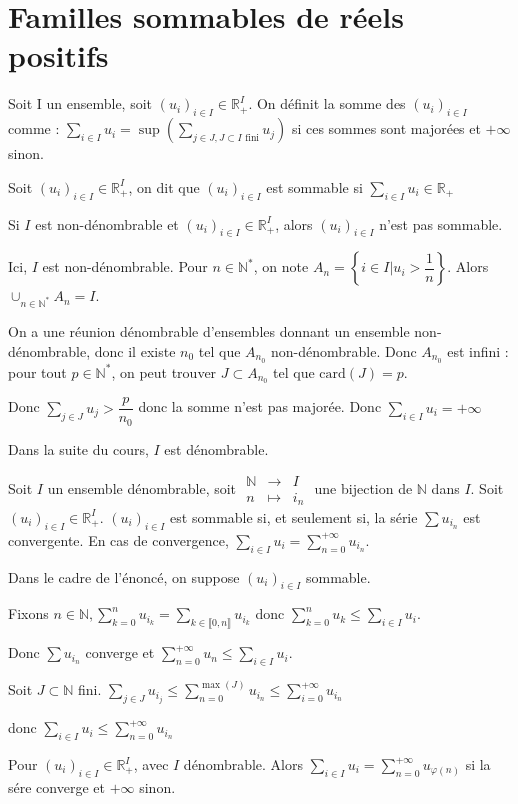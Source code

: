 \documentclass[a4paper,12pt]{book}
\newcommand{\Def}[2]{\begin{tcolorbox}[sharp corners, colback=white,colframe=blue!90!black!75, title=Définition : #1]#2\end{tcolorbox}}
\newcommand{\Thr}[2]{\begin{tcolorbox}[sharp corners, colback=white,colframe=red!90!black!75, title=Théorème : #1]#2\end{tcolorbox}}
\newcommand{\Prop}[2]{\begin{tcolorbox}[sharp corners, colback=white,colframe=red!90!black!75, title=Proposition : #1]#2\end{tcolorbox}}
\newcommand{\Pre}[1]{\begin{tcolorbox}[sharp corners, colback=white,colframe=green!60!green!30!black!75, title=Preuve]#1\end{tcolorbox}}
\def\R{\mathbb{R}}
\def\N{\mathbb{N}}
\begin{document}
\section{Familles sommables de réels positifs}
\Def{Somme de familles réelles positives}{Soit I un ensemble, soit $(u_i)_{i\in I}\in \R_+^I$. On définit la somme des $(u_i)_{i\in I}$ comme : $\sum\limits_{i\in I} u_i = \sup\left(\sum\limits_{j\in J, J\subset I\text{ fini}} u_j\right)$ si ces sommes sont majorées et $+\infty$ sinon.}
\Def{Familles sommables de réels positifs}{Soit $(u_i)_{i\in I}\in\R_+^I$, on dit que $(u_i)_{i\in I}$ est sommable si $\sum\limits_{i\in I} u_i\in \R_+$}
\Prop{Sommabilité et dénombrabilité}{Si $I$ est non-dénombrable et $(u_i)_{i\in I}\in \R_+^I$, alors $(u_i)_{i\in I}$ n'est pas sommable.}
\Pre{Ici, $I$ est non-dénombrable. Pour $n\in\N^*$, on note $A_n=\left\{i\in I\vert u_i>\dfrac{1}{n}\right\}$. Alors $\cup_{n\in\N^*} A_n = I$.
\par On a une réunion dénombrable d'ensembles donnant un ensemble non-dénombrable, donc il existe $n_0$ tel que $A_{n_0}$ non-dénombrable. Donc $A_{n_0}$ est infini : pour tout $p\in\N^*$, on peut trouver $J\subset A_{n_0}$ tel que $\mathrm{card}(J)= p$. 
\par Donc $\sum\limits_{j\in J} u_j>\dfrac{p}{n_0}$ donc la somme n'est pas majorée. Donc $\sum\limits_{i\in I} u_i = +\infty$}
Dans la suite du cours, $I$ est dénombrable.
\Thr{}{Soit $I$ un ensemble dénombrable, soit $\begin{array}{rcl} \N&\to&I \\n&\mapsto&i_n\end{array}$ une bijection de $\N$ dans $I$. Soit $(u_i)_{i\in I}\in\R_+^I$. $(u_i)_{i\in I}$ est sommable si, et seulement si, la série $\sum u_{i_n}$ est convergente. En cas de convergence, $\sum\limits_{i\in I} u_i = \sum\limits_{n=0}^{+\infty} u_{i_n}$.}
\Pre{Dans le cadre de l'énoncé, on suppose $(u_i)_{i\in I}$ sommable.\par Fixons $n\in\N, \sum\limits_{k=0}^n u_{i_k} = \sum\limits_{k\in\llbracket0,n\rrbracket}u_{i_k}$ donc $\sum\limits_{k=0}^nu_k \leq \sum\limits_{i\in I}u_i$.\par Donc $\sum u_{i_n}$ converge et $\sum\limits_{n=0}^{+\infty}u_n\leq \sum\limits_{i\in I} u_i$.
\par Soit $J\subset \N$ fini. $\sum\limits_{j\in J}u_{i_j}\leq \sum\limits_{n=0}^{\max(J)} u_{i_n} \leq \sum\limits_{i=0}^{+\infty}u_{i_n}$ \par donc $\sum\limits_{i\in I}u_i \leq \sum\limits_{n=0}^{+\infty}u_{i_n}$
\par Pour $(u_i)_{i\in I}\in\R_+^I$, avec $I$ dénombrable. Alors $\sum\limits_{i\in I} u_i = \sum\limits_{n=0}^{+\infty} u_{\varphi(n)}$ si la sére converge et $+\infty$ sinon.}
\end{document}
